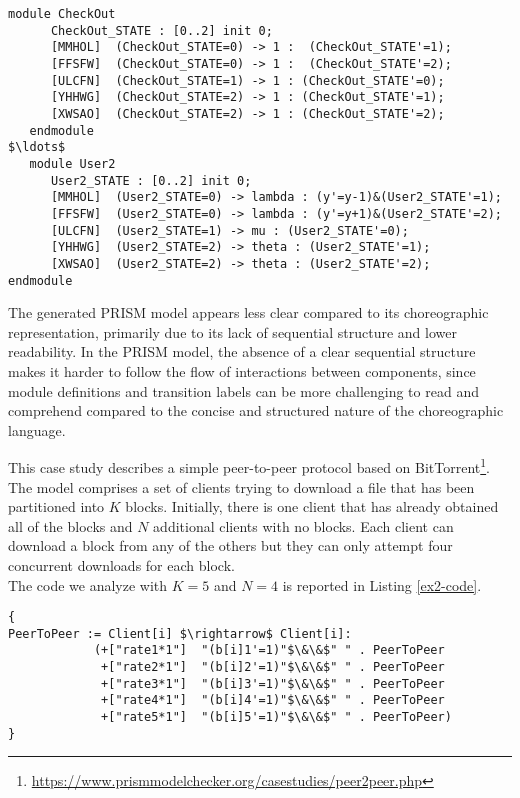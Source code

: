  \begin{lstlisting}[style=prism-color,caption={Generated PRISM program},captionpos=b,label={ex1-gen}]
   module CheckOut
      CheckOut_STATE : [0..2] init 0;
      [MMHOL]  (CheckOut_STATE=0) -> 1 :  (CheckOut_STATE'=1);
      [FFSFW]  (CheckOut_STATE=0) -> 1 :  (CheckOut_STATE'=2);
      [ULCFN]  (CheckOut_STATE=1) -> 1 : (CheckOut_STATE'=0);
      [YHHWG]  (CheckOut_STATE=2) -> 1 : (CheckOut_STATE'=1);
      [XWSAO]  (CheckOut_STATE=2) -> 1 : (CheckOut_STATE'=2);
   endmodule
$\ldots$
   module User2
      User2_STATE : [0..2] init 0;
      [MMHOL]  (User2_STATE=0) -> lambda : (y'=y-1)&(User2_STATE'=1);
      [FFSFW]  (User2_STATE=0) -> lambda : (y'=y+1)&(User2_STATE'=2);
      [ULCFN]  (User2_STATE=1) -> mu : (User2_STATE'=0);
      [YHHWG]  (User2_STATE=2) -> theta : (User2_STATE'=1);
      [XWSAO]  (User2_STATE=2) -> theta : (User2_STATE'=2);
endmodule
\end{lstlisting}
The generated PRISM model appears less clear compared to its
choreographic representation, primarily due to its lack of sequential
structure and lower readability.  In the PRISM model, the absence of a
clear sequential structure makes it harder to follow the flow of
interactions between components, 
since module definitions and transition labels can be more challenging
to read and comprehend compared to the concise and structured nature
of the choreographic language.



This case study describes a simple peer-to-peer protocol based on BitTorrent\footnote{\url{https://www.prismmodelchecker.org/casestudies/peer2peer.php}}. The model comprises a set of clients trying to download a file that has been partitioned into $K$ blocks. Initially, there is one client that has already obtained all of the blocks and $N$ additional clients with no blocks. Each client can download a block from any of the others but they can only attempt four concurrent downloads for each block.\\
The code we analyze with $K=5$ and $N=4$ is reported in Listing \ref{ex2-code}.
\begin{lstlisting}[style=chor-color,caption={Choreography for the Peer-To-Peer Protocol},captionpos=b,label={ex2-code}]
{
PeerToPeer := Client[i] $\rightarrow$ Client[i]: 
			(+["rate1*1"]  "(b[i]1'=1)"$\&\&$" " . PeerToPeer
			 +["rate2*1"]  "(b[i]2'=1)"$\&\&$" " . PeerToPeer
			 +["rate3*1"]  "(b[i]3'=1)"$\&\&$" " . PeerToPeer
			 +["rate4*1"]  "(b[i]4'=1)"$\&\&$" " . PeerToPeer
			 +["rate5*1"]  "(b[i]5'=1)"$\&\&$" " . PeerToPeer)
}
\end{lstlisting} 

